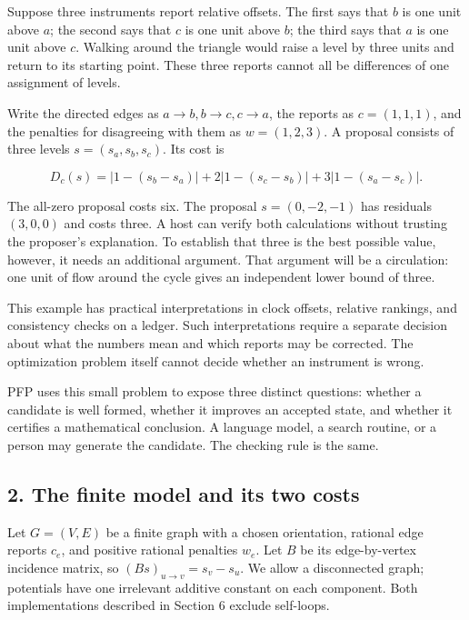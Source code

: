 \documentclass[
  11pt,
]{article}
\begin{document}
Suppose three instruments report relative offsets. The first says that
\(b\) is one unit above \(a\); the second says that \(c\) is one unit
above \(b\); the third says that \(a\) is one unit above \(c\). Walking
around the triangle would raise a level by three units and return to its
starting point. These three reports cannot all be differences of one
assignment of levels.

Write the directed edges as \(a\to b,b\to c,c\to a\), the reports as
\(c=(1,1,1)\), and the penalties for disagreeing with them as
\(w=(1,2,3)\). A proposal consists of three levels \(s=(s_a,s_b,s_c)\).
Its cost is

\[
D_c(s)=|1-(s_b-s_a)|+2|1-(s_c-s_b)|+3|1-(s_a-s_c)|.
\]

The all-zero proposal costs six. The proposal \(s=(0,-2,-1)\) has
residuals \((3,0,0)\) and costs three. A host can verify both
calculations without trusting the proposer's explanation. To establish
that three is the best possible value, however, it needs an additional
argument. That argument will be a circulation: one unit of flow around
the cycle gives an independent lower bound of three.

This example has practical interpretations in clock offsets, relative
rankings, and consistency checks on a ledger. Such interpretations
require a separate decision about what the numbers mean and which
reports may be corrected. The optimization problem itself cannot decide
whether an instrument is wrong.

PFP uses this small problem to expose three distinct questions: whether
a candidate is well formed, whether it improves an accepted state, and
whether it certifies a mathematical conclusion. A language model, a
search routine, or a person may generate the candidate. The checking
rule is the same.

\subsection{2. The finite model and its two
costs}\label{the-finite-model-and-its-two-costs}

Let \(G=(V,E)\) be a finite graph with a chosen orientation, rational
edge reports \(c_e\), and positive rational penalties \(w_e\). Let \(B\)
be its edge-by-vertex incidence matrix, so \((Bs)_{u\to v}=s_v-s_u\). We
allow a disconnected graph; potentials have one irrelevant additive
constant on each component. Both implementations described in Section 6
exclude self-loops.
\end{document}
